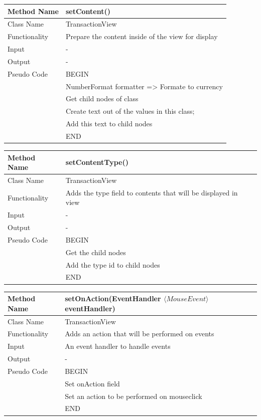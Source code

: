 \documentclass[12pt]{article}
\begin{document}
\begin{tabular}{ |p{3cm}||p{\colWidth}|  }
	\hline
	Method Name &  setContent()\\
	\hline
	Class Name & TransactionView\\
	\hline
	Functionality & Prepare the content inside of the view for display\\
	\hline
	Input & - \\
	\hline
	Output & -\\
	\hline
	Pseudo Code & BEGIN\\
	& NumberFormat formatter => Formate to currency \\
	& Get child nodes of class\\
	& Create text out of the values in this class;\\
	& Add this text to child nodes\\
	& END\\
	\hline
\end{tabular}

\begin{tabular}{ |p{3cm}||p{\colWidth}|  }
	\hline
	Method Name &  setContentType()\\
	\hline
	Class Name & TransactionView\\
	\hline
	Functionality & Adds the type field to contents that will be displayed in view\\
	\hline
	Input & - \\
	\hline
	Output & -\\
	\hline
	Pseudo Code & BEGIN\\
	&	Get the child nodes\\
	&	Add the type id to child nodes \\
	& END\\
	\hline
\end{tabular}    

\begin{tabular}{ |p{3cm}||p{\colWidth}|  }
	\hline
	Method Name &  setOnAction(EventHandler $\langle MouseEvent \rangle$ eventHandler)\\
	\hline
	Class Name & TransactionView\\
	\hline
	Functionality & Adds an action that will be performed on events\\
	\hline
	Input & An event handler to handle events \\
	\hline
	Output & -\\
	\hline
	Pseudo Code & BEGIN\\
	&	Set onAction field \\
	&	Set an action to be performed on mouseclick\\
	& END\\
	\hline
\end{tabular}  
\end{document}
